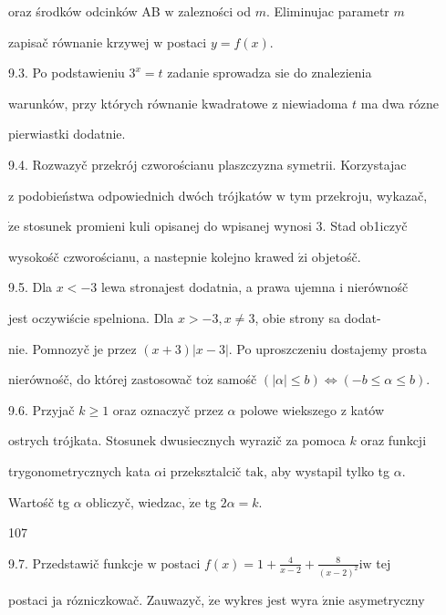 \documentclass[a4paper,12pt]{article}
\begin{document}
oraz środków odcinków AB $\mathrm{w}$ zalezności od $m$. Eliminujac parametr $m$

zapisač równanie krzywej $\mathrm{w}$ postaci $y=f(x).$

9.3. Po podstawieniu $3^{x} = t$ zadanie sprowadza $\mathrm{s}\mathrm{i}\mathrm{e}$ do znalezienia

warunków, przy których równanie kwadratowe $\mathrm{z}$ niewiadoma $t$ ma dwa rózne

pierwiastki dodatnie.

9.4. Rozwazyč przekrój czworościanu plaszczyzna symetrii. Korzystajac

$\mathrm{z}$ podobieństwa odpowiednich dwóch trójkatów $\mathrm{w}$ tym przekroju, wykazač,

$\dot{\mathrm{z}}\mathrm{e}$ stosunek promieni kuli opisanej do wpisanej wynosi 3. Stad ob1iczyč

wysokośč czworościanu, a nastepnie kolejno krawed $\acute{\mathrm{z}} \mathrm{i}$ objetośč.

9.5. Dla $x<-3$ lewa stronajest dodatnia, a prawa ujemna $\mathrm{i}$ nierównośč

jest oczywiście spelniona. Dla $x > -3, x \neq 3$, obie strony sa dodat-

nie. Pomnozyč je przez $(x+3)|x-3|$. Po uproszczeniu dostajemy prosta

nierównośč, do której zastosowač $\mathrm{t}\mathrm{o}\dot{\mathrm{z}}$ samośč $(|\alpha|\leq b)\Leftrightarrow(-b\leq\alpha\leq b).$

9.6. Przyjač $k \geq 1$ oraz oznaczyč przez $\alpha$ polowe wiekszego $\mathrm{z}$ katów

ostrych trójkata. Stosunek dwusiecznych wyrazič za pomoca $k$ oraz funkcji

trygonometrycznych kata $\alpha \mathrm{i}$ przeksztalcič $\mathrm{t}\mathrm{a}\mathrm{k}$, aby wystapil tylko tg $\alpha.$

Wartośč tg $\alpha$ obliczyč, wiedzac, $\dot{\mathrm{z}}\mathrm{e}$ tg $2\alpha=k.$





107

9.7. Przedstawič funkcje $\mathrm{w}$ postaci $f(x)=1+\displaystyle \frac{4}{x-2}+\frac{8}{(x-2)^{2}}\mathrm{i}\mathrm{w}$ tej

postaci $\mathrm{j}\mathrm{a}$ rózniczkowač. Zauwazyč, $\dot{\mathrm{z}}\mathrm{e}$ wykres jest wyra $\acute{\mathrm{z}}\mathrm{n}\mathrm{i}\mathrm{e}$ asymetryczny
\end{document}
